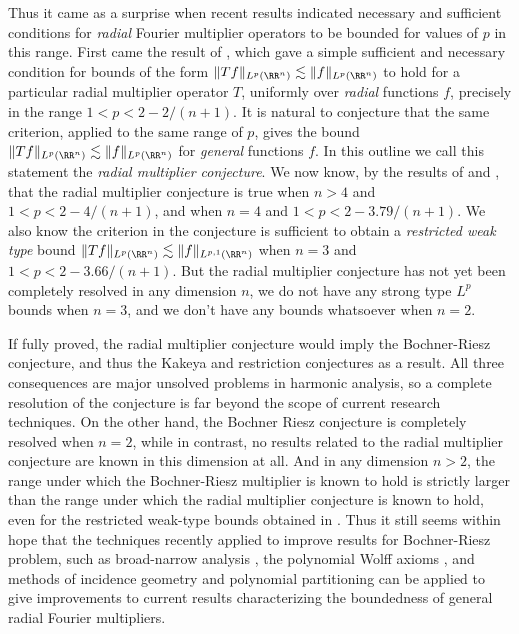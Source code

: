 Thus it came as a surprise when recent results indicated necessary and sufficient conditions for \emph{radial} Fourier multiplier operators to be bounded for values of $p$ in this range. First came the result of \cite{GarrigosandSeeger}, which gave a simple sufficient and necessary condition for bounds of the form $\| Tf \|_{L^p(\RR^n)} \lesssim \| f \|_{L^p(\RR^n)}$ to hold for a particular radial multiplier operator $T$, uniformly over \emph{radial} functions $f$, precisely in the range $1 < p < 2 - 2/(n+1)$. It is natural to conjecture that the same criterion, applied to the same range of $p$, gives the bound $\| Tf \|_{L^p(\RR^n)} \lesssim \| f \|_{L^p(\RR^n)}$ for \emph{general} functions $f$. In this outline we call this statement the \emph{radial multiplier conjecture}. We now know, by the results of \cite{HeoandNazarovandSeeger} and \cite{Cladek}, that the radial multiplier conjecture is true when $n > 4$ and $1 < p < 2 - 4/(n+1)$, and when $n = 4$ and $1 < p < 2 - 3.79/(n+1)$. We also know \cite{Cladek} the criterion in the conjecture is sufficient to obtain a \emph{restricted weak type} bound $\| Tf \|_{L^p(\RR^n)} \lesssim \| f \|_{L^{p,1}(\RR^n)}$ when $n = 3$ and $1 < p < 2 - 3.66/(n+1)$. But the radial multiplier conjecture has not yet been completely resolved in any dimension $n$, we do not have any strong type $L^p$ bounds when $n = 3$, and we don't have any bounds whatsoever when $n = 2$.

If fully proved, the radial multiplier conjecture would imply the Bochner-Riesz conjecture, and thus the Kakeya and restriction conjectures as a result. All three consequences are major unsolved problems in harmonic analysis, so a complete resolution of the conjecture is far beyond the scope of current research techniques. On the other hand, the Bochner Riesz conjecture is completely resolved when $n = 2$, while in contrast, no results related to the radial multiplier conjecture are known in this dimension at all. And in any dimension $n > 2$, the range under which the Bochner-Riesz multiplier is known to hold \cite{GuoandOhandWangandWuandZhang} is strictly larger than the range under which the radial multiplier conjecture is known to hold, even for the restricted weak-type bounds obtained in \cite{Cladek}. Thus it still seems within hope that the techniques recently applied to improve results for Bochner-Riesz problem, such as broad-narrow analysis \cite{BourgainandGuth}, the polynomial Wolff axioms \cite{KatzandRogers}, and methods of incidence geometry and polynomial partitioning \cite{Zahl2} can be applied to give improvements to current results characterizing the boundedness of general radial Fourier multipliers.

